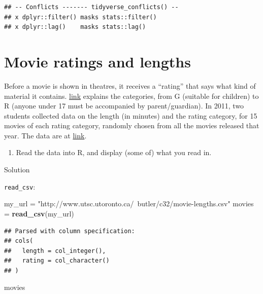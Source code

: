 \documentclass[]{tufte-book}
\newenvironment{Shaded}{}{}
\newcommand{\KeywordTok}[1]{\textcolor[rgb]{0.00,0.44,0.13}{\textbf{#1}}}
\newcommand{\NormalTok}[1]{#1}
\newcommand{\StringTok}[1]{\textcolor[rgb]{0.25,0.44,0.63}{#1}}
\providecommand{\tightlist}{%
  \setlength{\itemsep}{0pt}\setlength{\parskip}{0pt}}
\theoremstyle{definition}
\theoremstyle{definition}
\theoremstyle{definition}
\theoremstyle{remark}
\begin{document}
\begin{verbatim}
## -- Conflicts ------- tidyverse_conflicts() --
## x dplyr::filter() masks stats::filter()
## x dplyr::lag()    masks stats::lag()
\end{verbatim}

\hypertarget{movie-ratings-and-lengths}{%
\section{Movie ratings and lengths}\label{movie-ratings-and-lengths}}

Before a movie is shown in theatres, it receives a ``rating'' that says
what kind of material it contains.
\href{https://en.wikipedia.org/wiki/Motion_Picture_Association_of_America_film_rating_system}{link}
explains the categories, from G (suitable for children) to R (anyone
under 17 must be accompanied by parent/guardian). In 2011, two students
collected data on the length (in minutes) and the rating category, for
15 movies of each rating category, randomly chosen from all the movies
released that year. The data are at
\href{http://www.utsc.utoronto.ca/~butler/c32/movie-lengths.csv}{link}.

\begin{enumerate}
\def\labelenumi{(\alph{enumi})}
\tightlist
\item
  Read the data into R, and display (some of) what you read in.
\end{enumerate}

Solution

\texttt{read\_csv}:

\begin{Shaded}
\begin{Highlighting}[]
\NormalTok{my_url =}\StringTok{ "http://www.utsc.utoronto.ca/~butler/c32/movie-lengths.csv"}
\NormalTok{movies =}\StringTok{ }\KeywordTok{read_csv}\NormalTok{(my_url)}
\end{Highlighting}
\end{Shaded}

\begin{verbatim}
## Parsed with column specification:
## cols(
##   length = col_integer(),
##   rating = col_character()
## )
\end{verbatim}

\begin{Shaded}
\begin{Highlighting}[]
\NormalTok{movies}
\end{Highlighting}
\end{Shaded}
\end{document}
